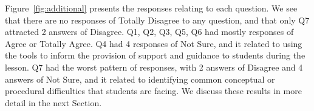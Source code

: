 Figure~\ref{fig:additional} presents the responses relating to each
question. We see that there are no responses of Totally Disagree to any question,
and that only Q7 attracted 2 answers of Disagree. Q1, Q2, Q3, Q5, Q6
had mostly responses of Agree or Totally Agree. Q4 had 4 responses of
Not Sure, and it related to using the tools to inform the provision of
support and guidance to students during the lesson. Q7 had the worst
pattern of responses, with 2 answers of Disagree and 4 answers of Not
Sure, and it related to identifying common conceptual or procedural
difficulties that students are facing. We discuss these results in
more detail in the next Section.




